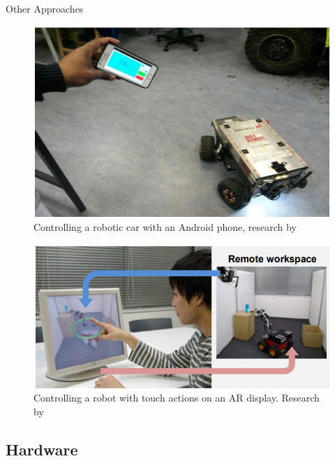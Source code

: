 \documentclass[t]{beamer}
\begin{document}
\begin{frame}{Other Approaches}

\begin{minipage}{0.49\linewidth}
\begin{figure}
	\includegraphics[width=\linewidth]{assets/pres/akupati.png}
	\caption{Controlling a robotic car with an Android phone, research by \citeauthor{Akupati2017}\cite{Akupati2017}}
\end{figure}
\end{minipage}
\begin{minipage}{0.49\linewidth}
\begin{figure}
	\includegraphics[width=\linewidth]{assets/pres/touchme.png}
	\caption{Controlling a robot with touch actions on an AR display. Research by \citeauthor{Hashimoto2013}\cite{Hashimoto2013}}
\end{figure}
\end{minipage}

\end{frame}

\subsection{Hardware}
\end{document}
